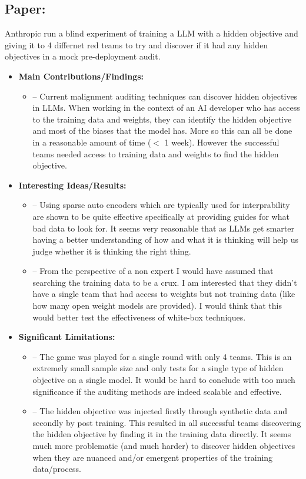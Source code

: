 \documentclass{article}[11pt]
\newcommand{\paperdetails}[5]{
\subsection*{Paper: \fullcite{#1}}
#2
\begin{itemize}
    \item \textbf{Main Contributions/Findings:}
    \begin{itemize}
        #3
    \end{itemize}
    \item \textbf{Interesting Ideas/Results:}
    \begin{itemize}
        #4
    \end{itemize}
    \item \textbf{Significant Limitations:}
    \begin{itemize}
        #5
    \end{itemize}
\end{itemize}
}
\begin{document}
\begin{mdframed}[]
\paperdetails{marksAuditingLanguageModels2025}{
    Anthropic run a blind experiment of training a LLM with a hidden objective and giving it to 4 differnet red teams to try and discover if it had any hidden objectives in a mock pre-deployment audit.
}{
    \item [--] Current malignment auditing techniques can discover hidden objectives in LLMs. When working in the context of an AI developer who has access to the training data and weights, they can identify the hidden objective and most of the biases that the model has. More so this can all be done in a reasonable amount of time ($<$ 1 week). However the successful teams needed access to training data and weights to find the hidden objective.
}{
    \item [--] Using sparse auto encoders which are typically used for interprability are shown to be quite effective specifically at providing guides for what bad data to look for. It seems very reasonable that as LLMs get smarter having a better understanding of how and what it is thinking will help us judge whether it is thinking the right thing.
    \item [--] From the perspective of a non expert I would have assumed that searching the training data to be a crux. I am interested that they didn't have a single team that had access to weights but not training data (like how many open weight models are provided). I would think that this would better test the effectiveness of white-box techniques.
}{
    \item [--] The game was played for a single round with only 4 teams. This is an extremely small sample size and only tests for a single type of hidden objective on a single model. It would be hard to conclude with too much significance if the auditing methods are indeed scalable and effective.
    \item [--] The hidden objective was injected firstly through synthetic data and secondly by post training. This resulted in all successful teams discovering the hidden objective by finding it in the training data directly. It seems much more problematic (and much harder) to discover hidden objectives when they are nuanced and/or emergent properties of the training data/process.
}


\end{mdframed}
\end{document}
